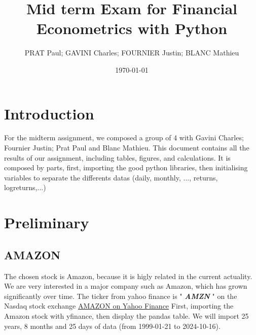 \documentclass{article}
\begin{document}
\title{Mid term Exam for Financial Econometrics with Python}
\author{PRAT Paul; GAVINI Charles; FOURNIER Justin; BLANC Mathieu}
\date{\today}

\maketitle %

\tableofcontents %

\section{Introduction}
For the midterm assignment, we composed a group of 4 with Gavini Charles; Fournier Justin; Prat Paul and Blanc Mathieu. 
This document contains all the results of our assignment, including tables, figures, and calculations. 
It is composed by  parts, first, importing the good python libraries,
then initialising variables to separate the differents datas (daily, monthly, ..., returns, logreturns,...)


\section{Preliminary}


\subsection{AMAZON}

The chosen stock is Amazon, because it is higly related in the current actuality. We are very interested in a major company such as Amazon, which has grown significantly over time.
The ticker from yahoo finance is " \textbf{\textit{AMZN}} " on the Nasdaq stock exchange \href{https://finance.yahoo.com/quote/AMZN/.}{AMAZON on Yahoo Finance}
First, importing the Amazon stock with yfinance, then display the pandas table.
We will import 25 years, 8 months and 25 days of data (from 1999-01-21 to 2024-10-16).
\end{document}
